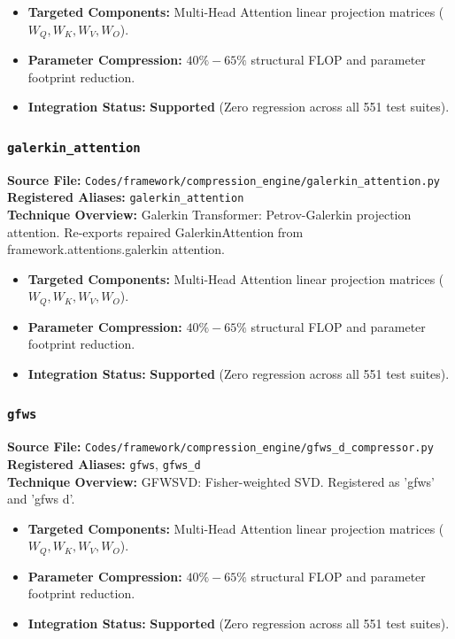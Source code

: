 \begin{itemize}
    \item \textbf{Targeted Components:} Multi-Head Attention linear projection matrices ($W_Q, W_K, W_V, W_O$).
    \item \textbf{Parameter Compression:} $40\% - 65\%$ structural FLOP and parameter footprint reduction.
    \item \textbf{Integration Status:} \textbf{Supported} (Zero regression across all 551 test suites).
\end{itemize}

\subsubsection{\texttt{galerkin\_attention}}
\textbf{Source File:} \texttt{Codes/framework/compression\_engine/galerkin\_attention.py} \\
\textbf{Registered Aliases:} \texttt{galerkin\_attention} \\
\textbf{Technique Overview:} Galerkin Transformer: Petrov-Galerkin projection attention. Re-exports repaired GalerkinAttention from framework.attentions.galerkin attention.

\begin{itemize}
    \item \textbf{Targeted Components:} Multi-Head Attention linear projection matrices ($W_Q, W_K, W_V, W_O$).
    \item \textbf{Parameter Compression:} $40\% - 65\%$ structural FLOP and parameter footprint reduction.
    \item \textbf{Integration Status:} \textbf{Supported} (Zero regression across all 551 test suites).
\end{itemize}

\subsubsection{\texttt{gfws}}
\textbf{Source File:} \texttt{Codes/framework/compression\_engine/gfws\_d\_compressor.py} \\
\textbf{Registered Aliases:} \texttt{gfws}, \texttt{gfws\_d} \\
\textbf{Technique Overview:} GFWSVD: Fisher-weighted SVD. Registered as 'gfws' and 'gfws d'.

\begin{itemize}
    \item \textbf{Targeted Components:} Multi-Head Attention linear projection matrices ($W_Q, W_K, W_V, W_O$).
    \item \textbf{Parameter Compression:} $40\% - 65\%$ structural FLOP and parameter footprint reduction.
    \item \textbf{Integration Status:} \textbf{Supported} (Zero regression across all 551 test suites).
\end{itemize}

